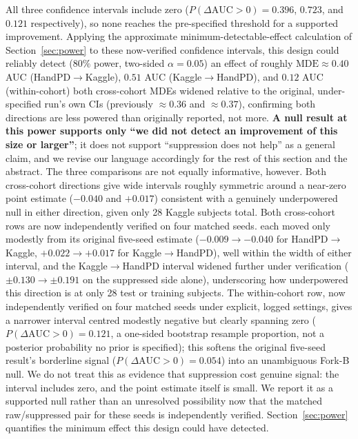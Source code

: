 \documentclass[3p,final,10pt]{elsarticle}
\begin{document}
All three confidence intervals include zero ($P(\Delta\text{AUC}>0)=0.396$,
$0.723$, and $0.121$ respectively), so none reaches the pre-specified
threshold for a supported improvement. Applying the approximate
minimum-detectable-effect calculation of Section~\ref{sec:power} to these
now-verified confidence intervals, this
design could reliably detect ($80\%$ power, two-sided
$\alpha{=}0.05$) an effect of roughly $\mathrm{MDE}\approx0.40$ AUC
(HandPD$\to$Kaggle), $0.51$ AUC (Kaggle$\to$HandPD), and $0.12$ AUC
(within-cohort) both cross-cohort MDEs widened relative to the original,
under-specified run's own CIs (previously $\approx0.36$ and $\approx0.37$),
confirming both directions are less powered than originally reported, not
more. \textbf{A null result at this power supports only ``we did
not detect an improvement of this size or larger''}; it does not support
``suppression does not help'' as a general claim, and we revise our
language accordingly for the rest of this section and the abstract. The
three comparisons are not
equally informative, however. Both cross-cohort directions give wide
intervals roughly symmetric around a near-zero point estimate ($-0.040$ and
$+0.017$) consistent with a genuinely underpowered null in either
direction, given only 28 Kaggle subjects total. Both cross-cohort rows are
now independently verified on four matched seeds. each moved only modestly
from its original five-seed estimate ($-0.009\to-0.040$ for
HandPD$\to$Kaggle, $+0.022\to+0.017$ for Kaggle$\to$HandPD), well within
the width of either interval, and the Kaggle$\to$HandPD interval widened
further under verification ($\pm0.130\to\pm0.191$ on the suppressed side
alone), underscoring how underpowered this direction is at only 28 test
or training subjects. The within-cohort row, now
independently verified on four matched seeds under explicit, logged
settings, gives a narrower interval centred modestly negative but clearly
spanning zero ($P(\Delta\text{AUC}>0)=0.121$, a one-sided bootstrap resample
proportion, not a posterior probability no prior is specified); this
softens the original five-seed result's borderline signal
($P(\Delta\text{AUC}>0)=0.054$) into an unambiguous Fork-B null. We do not
treat this as evidence that suppression cost genuine signal: the interval
includes zero, and the point estimate itself is small. We report it as a
supported null rather than an unresolved possibility now that the matched
raw/suppressed pair for these seeds is independently verified.
Section~\ref{sec:power} quantifies the minimum effect this design could
have detected.
\end{document}
